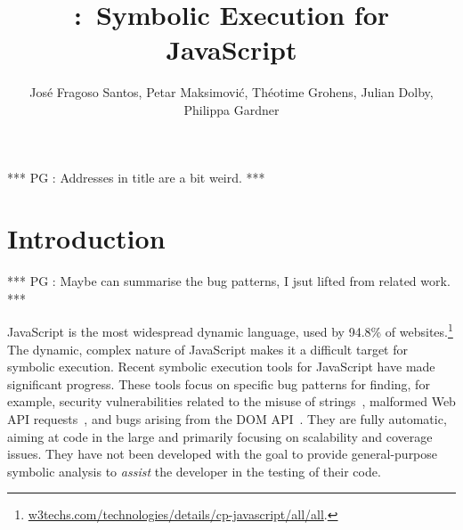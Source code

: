 \documentclass[sigconf, review]{acmart}
\title[\cosette:~Symbolic Execution for JavaScript]{\cosette:~Symbolic Execution for JavaScript}
\author[J. Fragoso Santos$^{\dag}$, P. Maksimovi\'c, T. Grohens, , J. Dolby,
P. Gardner]{Jos\'e Fragoso Santos, Petar Maksimovi\'c, Th\'eotime
  Grohens, Julian Dolby, Philippa Gardner}
\affiliation{Imperial College London, ENS Paris, IBM New York}
\newcommand{\pgmaxinline}[1]{ {\color{purple} *** PG : #1 ***} }
\newif\ifComments
\newcommand{\pg}[1]{%
\ifComments
\begin{center}
\fbox{\begin{minipage}{0.4\textwidth} \color{red}
{\rm PG: \small #1}
\end{minipage}}
\end{center}
\fi}
\newcommand{\pmax}[1]{%
\ifComments
\begin{center}
\fbox{\begin{minipage}{0.4\textwidth} \color{blue}
{\rm PM: \small #1}
\end{minipage}}
\end{center}
\fi}
\begin{document}
%

\maketitle 

\pgmaxinline{Addresses in title are a bit weird.}

\section{Introduction}


%
%


\pgmaxinline{Maybe can summarise the bug patterns, I jsut lifted from
  related work.}

JavaScript is the most widespread dynamic language, used by 94.8\% of 
websites.\footnote{\url{w3techs.com/technologies/details/cp-javascript/all/all}.}
The dynamic, complex  nature of JavaScript  makes  it a
difficult target for symbolic execution.  Recent symbolic execution
tools for JavaScript have made significant progress. These  tools focus
on specific bug
patterns for finding, for example, 
security vulnerabilities related to the
misuse of strings~\cite{saxena:sp:2010},
malformed Web API requests~\cite{wittern:icse:2018}, and bugs
arising from the  DOM API~\cite{li:fse:2014}. They are 
fully automatic, aiming at code in the large and 
primarily focusing on scalability and coverage issues. They have not
been developed with the goal to provide general-purpose symbolic
analysis to {\em assist} the developer in the testing of their code.
\end{document}
